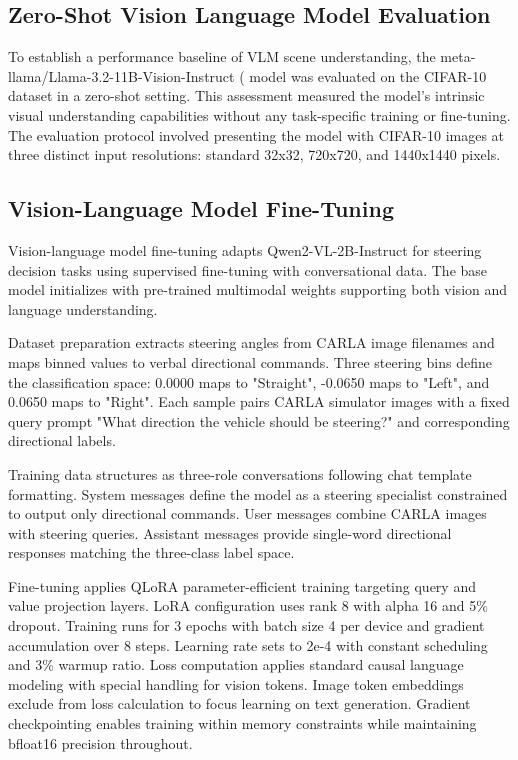 
\subsection{Zero-Shot Vision Language Model Evaluation}
To establish a performance baseline of VLM scene understanding, the meta-llama/Llama-3.2-11B-Vision-Instruct (\cite{meta2024llama3vision} model was evaluated on the CIFAR-10 dataset in a zero-shot setting. This assessment measured the model's intrinsic visual understanding capabilities without any task-specific training or fine-tuning. The evaluation protocol involved presenting the model with CIFAR-10 images at three distinct input resolutions: standard 32x32, 720x720, and 1440x1440 pixels. 


\subsection{Vision-Language Model Fine-Tuning}
Vision-language model fine-tuning adapts Qwen2-VL-2B-Instruct \cite{bai2023qwen} for steering decision tasks using supervised fine-tuning with conversational data. The base model initializes with pre-trained multimodal weights supporting both vision and language understanding.

Dataset preparation extracts steering angles from CARLA image filenames and maps binned  values to verbal directional commands. Three steering bins define the classification space: 0.0000 maps to "Straight", -0.0650 maps to "Left", and 0.0650 maps to "Right". Each sample pairs CARLA simulator images with a fixed query prompt "What direction the vehicle should be steering?" and corresponding directional labels.

Training data structures as three-role conversations following chat template formatting. System messages define the model as a steering specialist constrained to output only directional commands. User messages combine CARLA images with steering queries. Assistant messages provide single-word directional responses matching the three-class label space.

Fine-tuning applies QLoRA \cite{dettmers2023qlora} parameter-efficient training targeting query and value projection layers. LoRA \cite{hu2021lora} configuration uses rank 8 with alpha 16 and 5\% dropout. Training runs for 3 epochs with batch size 4 per device and gradient accumulation over 8 steps. Learning rate sets to 2e-4 with constant scheduling and 3\% warmup ratio.
Loss computation applies standard causal language modeling with special handling for vision tokens. Image token embeddings exclude from loss calculation to focus learning on text generation. Gradient checkpointing enables training within memory constraints while maintaining bfloat16 precision throughout.

